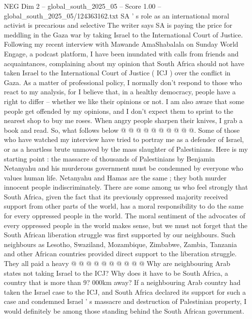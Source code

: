 \begin{textsample}{NEG Dim 2 – global\_south\_2025\_05 – Score 1.00 – global\_south\_2025\_05/124363162.txt}  \label{ex:f2_neg_147}
SA ' s role as an international moral activist is precarious and selective The writer says SA is paying the price for meddling in the Gaza war by taking Israel to the International Court of Justice.
Following my recent interview with Mawande AmaShabalala on Sunday World Engage, a podcast platform, I have been inundated with calls from friends and acquaintances, complaining about my opinion that South Africa should not have taken Israel to the International Court of Justice ( ICJ ) over the conflict in Gaza.
As a matter of professional policy, I normally don't respond to those who react to my analysis, for I believe that, in a healthy democracy, people have a right to differ -- whether we like their opinions or not.
I am also aware that some people get offended by my opinions, and I don't expect them to sprint to the nearest shop to buy me roses.
When angry people sharpen their knives, I grab a book and read.
So, what follows below @ @ @ @ @ @ @ @ @ @.
Some of those who have watched my interview have tried to portray me as a defender of Israel, or as a heartless brute unmoved by the mass slaughter of Palestinians.
Here is my starting point : the massacre of thousands of Palestinians by Benjamin Netanyahu and his murderous government must be condemned by everyone who values human life.
Netanyahu and Hamas are the same ; they both murder innocent people indiscriminately.
There are some among us who feel strongly that South Africa, given the fact that its previously oppressed majority received support from other parts of the world, has a moral responsibility to do the same for every oppressed people in the world.
The moral sentiment of the advocates of every oppressed people in the world makes sense, but we must not forget that the South African liberation struggle was first supported by our neighbours.
Such neighbours as Lesotho, Swaziland, Mozambique, Zimbabwe, Zambia, Tanzania and other African countries provided direct support to the liberation struggle.
They all paid a heavy @ @ @ @ @ @ @ @ @ @ Why are neighbouring Arab states not taking Israel to the ICJ?
Why does it have to be South Africa, a country that is more than 9? 000km away?
If a neighbouring Arab country had taken the Israel case to the ICJ, and South Africa declared its support for such a case and condemned Israel ' s massacre and destruction of Palestinian property, I would definitely be among those standing behind the South African government.

\end{textsample}
